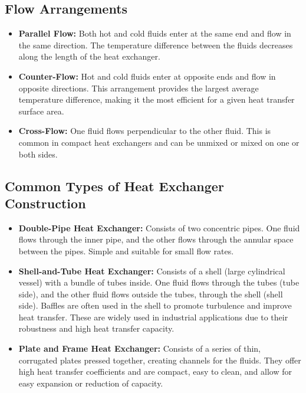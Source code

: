 \subsection{Flow Arrangements}
\begin{itemize}
    \item \textbf{Parallel Flow:} Both hot and cold fluids enter at the same end and flow in the same direction. The temperature difference between the fluids decreases along the length of the heat exchanger.
    \item \textbf{Counter-Flow:} Hot and cold fluids enter at opposite ends and flow in opposite directions. This arrangement provides the largest average temperature difference, making it the most efficient for a given heat transfer surface area.
    \item \textbf{Cross-Flow:} One fluid flows perpendicular to the other fluid. This is common in compact heat exchangers and can be unmixed or mixed on one or both sides.
\end{itemize}

\subsection{Common Types of Heat Exchanger Construction}
\begin{itemize}
    \item \textbf{Double-Pipe Heat Exchanger:} Consists of two concentric pipes. One fluid flows through the inner pipe, and the other flows through the annular space between the pipes. Simple and suitable for small flow rates.
    \item \textbf{Shell-and-Tube Heat Exchanger:} Consists of a shell (large cylindrical vessel) with a bundle of tubes inside. One fluid flows through the tubes (tube side), and the other fluid flows outside the tubes, through the shell (shell side). Baffles are often used in the shell to promote turbulence and improve heat transfer. These are widely used in industrial applications due to their robustness and high heat transfer capacity.
    \item \textbf{Plate and Frame Heat Exchanger:} Consists of a series of thin, corrugated plates pressed together, creating channels for the fluids. They offer high heat transfer coefficients and are compact, easy to clean, and allow for easy expansion or reduction of capacity.
\end{itemize}

